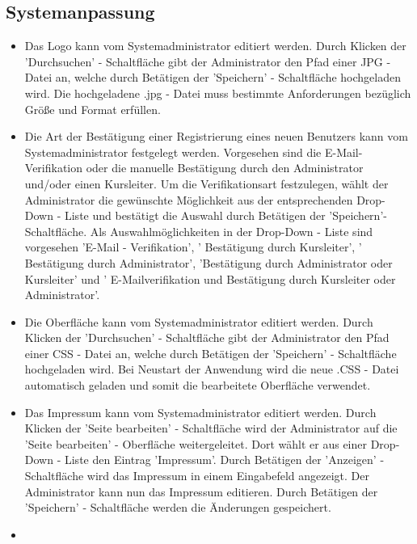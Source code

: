 \documentclass[a4paper]{scrreprt}
\begin{document}
		\subsection{Systemanpassung}
			\begin{itemize}
				\item {}
					Das Logo kann vom Systemadministrator editiert werden. Durch Klicken der 'Durchsuchen' - Schaltfläche gibt der Administrator den Pfad einer \gls{JPG} - Datei an, welche durch Betätigen der 'Speichern' - Schaltfläche hochgeladen wird. Die hochgeladene .jpg - Datei muss bestimmte Anforderungen bezüglich Größe und Format erfüllen.
				\item {}
					Die Art der Bestätigung einer Registrierung eines neuen Benutzers kann vom Systemadministrator festgelegt werden.
					Vorgesehen sind die E-Mail-Verifikation oder die manuelle Bestätigung durch den Administrator und/oder einen Kursleiter. Um die Verifikationsart festzulegen, wählt der Administrator die gewünschte Möglichkeit aus der entsprechenden Drop-Down - Liste und bestätigt die Auswahl durch Betätigen der 'Speichern'- Schaltfläche. Als Auswahlmöglichkeiten in der Drop-Down - Liste sind vorgesehen 'E-Mail - Verifikation', ' Bestätigung durch Kursleiter', ' Bestätigung durch Administrator', 'Bestätigung durch Administrator oder Kursleiter' und ' E-Mailverifikation und Bestätigung durch Kursleiter oder Administrator'.
				\item {}
					Die Oberfläche kann vom Systemadministrator editiert werden. Durch Klicken der 'Durchsuchen' - Schaltfläche gibt der Administrator den Pfad einer \gls{CSS} - Datei an, welche durch Betätigen der 'Speichern' - Schaltfläche hochgeladen wird. Bei Neustart der Anwendung wird die neue .CSS - Datei automatisch geladen und somit die bearbeitete Oberfläche verwendet.
				\item {}
					Das Impressum kann vom Systemadministrator editiert werden. Durch Klicken der 'Seite bearbeiten' - Schaltfläche wird der Administrator auf die 'Seite bearbeiten' - Oberfläche weitergeleitet. Dort wählt er aus einer Drop-Down - Liste den Eintrag 'Impressum'. Durch Betätigen der 'Anzeigen' - Schaltfläche wird das Impressum in einem Eingabefeld angezeigt. Der Administrator kann nun das Impressum editieren. Durch Betätigen der 'Speichern' - Schaltfläche werden die Änderungen gespeichert.  
				\item {}

\end{itemize}
\end{document}
